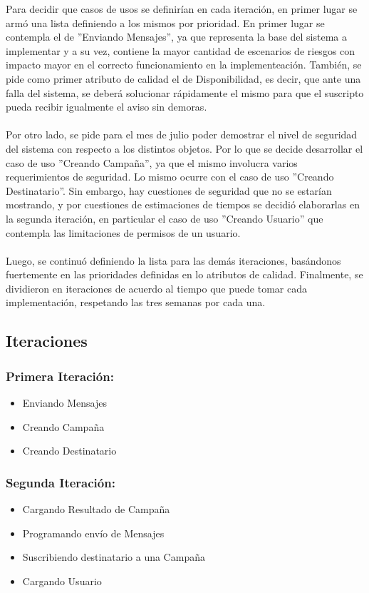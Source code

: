\documentclass[a4paper, 11pt]{article}
\begin{document}
Para decidir que casos de usos se definirían en cada iteración, en primer lugar se armó una lista definiendo a los mismos por prioridad. En primer lugar se contempla el de ''Enviando Mensajes'', ya que representa la base del sistema a implementar y a su vez, contiene la mayor cantidad de escenarios de riesgos con impacto mayor en el correcto funcionamiento en la implementeación. También, se pide como primer atributo de calidad el de Disponibilidad, es decir, que ante una falla del sistema, se deberá solucionar rápidamente el mismo para que el suscripto pueda recibir igualmente el aviso sin demoras.\\ 
\\
Por otro lado, se pide para el mes de julio poder demostrar el nivel de seguridad del sistema con respecto a los distintos objetos. Por lo que se decide desarrollar el caso de uso ''Creando Campaña'', ya que el mismo involucra varios requerimientos de seguridad. Lo mismo ocurre con el caso de uso ''Creando Destinatario''. Sin embargo, hay cuestiones de seguridad que no se estar\'ian mostrando, y por cuestiones de estimaciones de tiempos se decidi\'o elaborarlas en la segunda iteraci\'on, en particular el caso de uso ''Creando Usuario'' que contempla las limitaciones de permisos de un usuario.\\
\\
Luego, se continuó definiendo la lista para las demás iteraciones, basándonos fuertemente en las prioridades definidas en lo atributos de calidad. Finalmente, se dividieron en iteraciones de acuerdo al tiempo que puede tomar cada implementación, respetando las tres semanas por cada una. 




\subsection{Iteraciones}
\subsubsection{Primera Iteraci\'on:}
\begin{itemize}
\item Enviando Mensajes
\item Creando Campaña
\item Creando Destinatario
\end{itemize}

\subsubsection{Segunda Iteraci\'on:}
\begin{itemize}
\item Cargando Resultado de Campaña
\item Programando envío de Mensajes
\item Suscribiendo destinatario a una Campaña
\item Cargando Usuario
\end{itemize}
\end{document}
